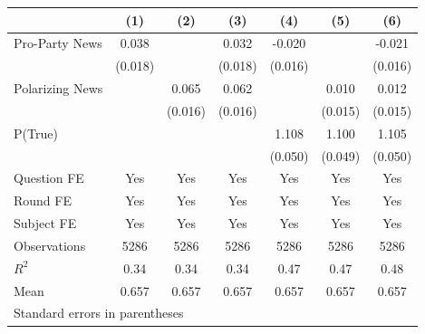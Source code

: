 \begin{tabular}{l*{6}{c}}
\hline\hline
                    &\multicolumn{1}{c}{(1)}&\multicolumn{1}{c}{(2)}&\multicolumn{1}{c}{(3)}&\multicolumn{1}{c}{(4)}&\multicolumn{1}{c}{(5)}&\multicolumn{1}{c}{(6)}\\
\hline
Pro-Party News      &    0.038&         &    0.032&   -0.020&         &   -0.021\\
                    &  (0.018)&         &  (0.018)&  (0.016)&         &  (0.016)\\
Polarizing News     &         &    0.065&    0.062&         &    0.010&    0.012\\
\hspace{9mm}        &         &  (0.016)&  (0.016)&         &  (0.015)&  (0.015)\\
P(True)             &         &         &         &    1.108&    1.100&    1.105\\
                    &         &         &         &  (0.050)&  (0.049)&  (0.050)\\
Question FE         &      Yes&      Yes&      Yes&      Yes&      Yes&      Yes\\
Round FE            &      Yes&      Yes&      Yes&      Yes&      Yes&      Yes\\
Subject FE          &      Yes&      Yes&      Yes&      Yes&      Yes&      Yes\\
\hline
Observations        &     5286&     5286&     5286&     5286&     5286&     5286\\
\(R^{2}\)           &     0.34&     0.34&     0.34&     0.47&     0.47&     0.48\\
Mean                &    0.657&    0.657&    0.657&    0.657&    0.657&    0.657\\
\hline\hline
\multicolumn{7}{l}{\footnotesize Standard errors in parentheses}\\
\end{tabular}
